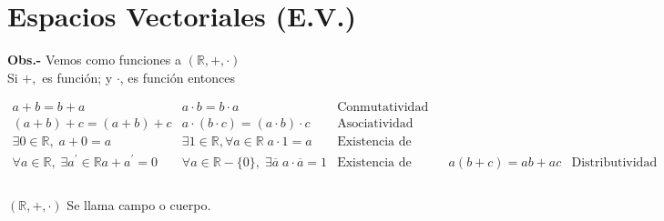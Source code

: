 \chapter{Espacios Vectoriales (E.V.)}


\begin{center}
\end{center}

\textbf{Obs.-} Vemos como funciones a $(\mathbb{R},+,\cdot)$\\

Si $+,$ es función; y $\cdot$, es función entonces 

$$\begin{array}{lll}
    a+b = b+a & a\cdot b = b\cdot a & \mbox{Conmutatividad}\\
    (a+b) + c = (a+b) + c &a\cdot(b\cdot c) = (a\cdot b)\cdot c&\mbox{Asociatividad}\\
    \exists 0 \in \mathbb{R},\; a+0=a &\exists 1 \in \mathbb{R},\forall a \in \mathbb{R}\; a\cdot 1 = a&\mbox{Existencia de neutro.}\\
    \forall a \in \mathbb{R},\; \exists a^{'}\in \mathbb{R} a+a^{'} = 0 &\forall a \in \mathbb{R}-\lbrace0\rbrace,\; \exists \overline{a}\; a\cdot \overline{a}=1&\mbox{Existencia de inverso.}
									&&a(b+c)=ab+ac&\mbox{Distributividad}\\\\
\end{array}$$

$(\mathbb{R},+,\cdot)$ Se llama campo o cuerpo.\\\\

\begin{center}
\end{center}



$$\begin{array}{cccc}
    + : & ^2\times \mathbbrR}^2 & \Longrightarrow &\mathbb{R}^2\\
	&&&\\
	&&&\\
\end{array}$$

